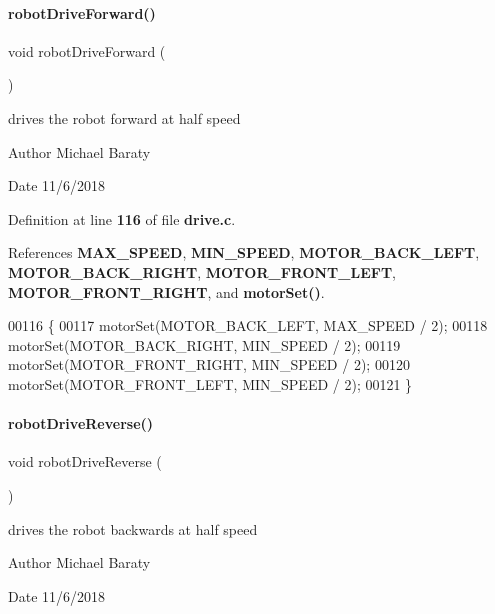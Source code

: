 \paragraph{robot\+Drive\+Forward()}
{\footnotesize\ttfamily void robot\+Drive\+Forward (\begin{DoxyParamCaption}{ }\end{DoxyParamCaption})}



drives the robot forward at half speed 

\begin{DoxyAuthor}{Author}
Michael Baraty 
\end{DoxyAuthor}
\begin{DoxyDate}{Date}
11/6/2018 
\end{DoxyDate}


Definition at line \textbf{ 116} of file \textbf{ drive.\+c}.



References \textbf{ M\+A\+X\+\_\+\+S\+P\+E\+ED}, \textbf{ M\+I\+N\+\_\+\+S\+P\+E\+ED}, \textbf{ M\+O\+T\+O\+R\+\_\+\+B\+A\+C\+K\+\_\+\+L\+E\+FT}, \textbf{ M\+O\+T\+O\+R\+\_\+\+B\+A\+C\+K\+\_\+\+R\+I\+G\+HT}, \textbf{ M\+O\+T\+O\+R\+\_\+\+F\+R\+O\+N\+T\+\_\+\+L\+E\+FT}, \textbf{ M\+O\+T\+O\+R\+\_\+\+F\+R\+O\+N\+T\+\_\+\+R\+I\+G\+HT}, and \textbf{ motor\+Set()}.


\begin{DoxyCode}
00116                          \{
00117   motorSet(MOTOR_BACK_LEFT, MAX_SPEED / 2);
00118   motorSet(MOTOR_BACK_RIGHT, MIN_SPEED / 2);
00119   motorSet(MOTOR_FRONT_RIGHT, MIN_SPEED / 2);
00120   motorSet(MOTOR_FRONT_LEFT, MIN_SPEED / 2);
00121 \}
\end{DoxyCode}
\mbox{\label{drive_8h_a151c59da152a110b01311c4f893afd3b}} 
\paragraph{robot\+Drive\+Reverse()}
{\footnotesize\ttfamily void robot\+Drive\+Reverse (\begin{DoxyParamCaption}{ }\end{DoxyParamCaption})}



drives the robot backwards at half speed 

\begin{DoxyAuthor}{Author}
Michael Baraty 
\end{DoxyAuthor}
\begin{DoxyDate}{Date}
11/6/2018 
\end{DoxyDate}


